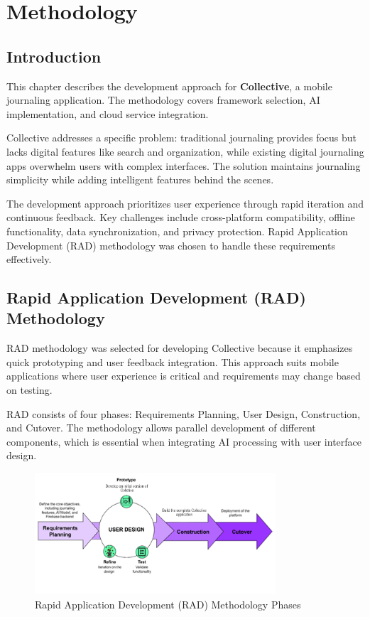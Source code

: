  \chapter{Methodology}\label{ch:methodology}

\section{Introduction}\label{sec:intro}

This chapter describes the development approach for \textbf{Collective}, a mobile journaling application. The methodology covers framework selection, AI implementation, and cloud service integration.

Collective addresses a specific problem: traditional journaling provides focus but lacks digital features like search and organization, while existing digital journaling apps overwhelm users with complex interfaces. The solution maintains journaling simplicity while adding intelligent features behind the scenes.

The development approach prioritizes user experience through rapid iteration and continuous feedback. Key challenges include cross-platform compatibility, offline functionality, data synchronization, and privacy protection. Rapid Application Development (RAD) methodology was chosen to handle these requirements effectively.

\section{Rapid Application Development (RAD) Methodology}\label{sec:rad}

RAD methodology was selected for developing Collective because it emphasizes quick prototyping and user feedback integration. This approach suits mobile applications where user experience is critical and requirements may change based on testing.

RAD consists of four phases: Requirements Planning, User Design, Construction, and Cutover. The methodology allows parallel development of different components, which is essential when integrating AI processing with user interface design.

\begin{figure}[H]
\centering
\includegraphics[width=0.8\textwidth]{files/imgs/RAD.png}
\caption{Rapid Application Development (RAD) Methodology Phases}
\label{fig:rad-methodology}
\end{figure}

